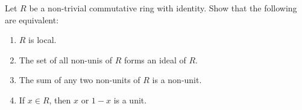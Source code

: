 \documentclass[12pt,letterpaper,boxed]{hmcpset}
\begin{document}
\begin{solution}
\end{solution}

\clearpage

\begin{problem}[18.6.1]
Let $R$ be a non-trivial commutative ring with identity. Show that the following are equivalent:
\begin{enumerate}[label=\alph*]
\item $R$ is local.
\item The set of all non-unis of $R$ forms an ideal of $R$.
\item The sum of any two non-units of $R$ is a non-unit.
\item If $x \in R$, then $x$ or $1-x$ is a unit.
\end{enumerate}
\end{problem}

\begin{solution}
\end{solution}
\end{document}
